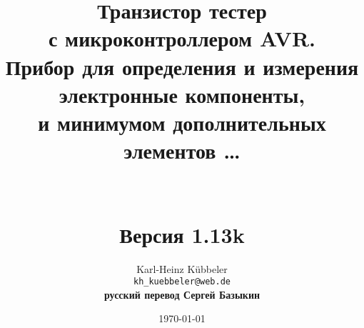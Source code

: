 \documentclass[12pt,a4paper,oneside,english]{report}
\begin{document}
\begin{figure}[t]
\end{figure}
\newcommand\electricC {
\hspace{-12 pt}
\begin{circuitikz}
\draw (0,0) to[capacitor] (0:1);
\end{circuitikz}
\hspace{-6 pt}
}
\newcommand\electricR {
\hspace{-12 pt}
\begin{circuitikz}
\draw (0,0) to[european resistor] (0:1);
\end{circuitikz}
\hspace{-6 pt}
}
\newcommand\electricL {
\hspace{-12 pt}
\begin{circuitikz}
\draw (0,0) 
 to[american inductor] (-1,0) 
;\end{circuitikz}
\hspace{-6 pt}
}
\newcommand\electricDAK {
\begin{circuitikz}
\draw (0,0) to[full diode] (0:1);
\end{circuitikz}
}
\newcommand\electricDKA {
\begin{circuitikz}
\draw (0,0) to[full diode] (180:1);
\end{circuitikz}
}
\title{Транзистор тестер \\
с микроконтроллером AVR.\\
Прибор для определения и измерения \\
электронные компоненты, \\
и минимумом дополнительных элементов \dots \\
~\\
~\\
Версия 1.13k \\
}
\author{Karl-Heinz K\"ubbeler\\
\texttt{kh\_kuebbeler@web.de}\\
\textbf{{\scriptsize русский перевод Сергей Базыкин}}}
\vspace{1cm}
\date{\today}
\maketitle
\tableofcontents




\end{document}
